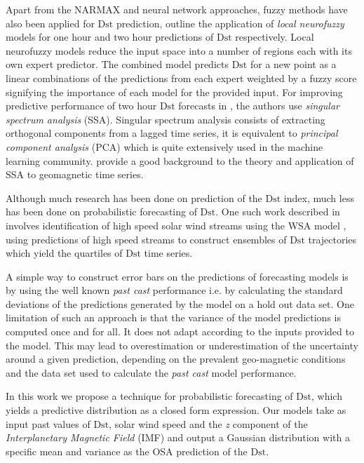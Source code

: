 Apart from the NARMAX and neural network approaches, fuzzy methods have also been applied for 
$\mathrm{Dst}$ prediction, \citet{SWE:SWE146,Sharifi2006} outline the application of 
\emph{local neurofuzzy} models for one hour and two hour predictions of $\mathrm{Dst}$ 
respectively. Local neurofuzzy models reduce the input space into a number of regions each with its 
own expert predictor. The combined model predicts $\mathrm{Dst}$ for a new point as a linear 
combinations of the predictions from each expert weighted by a fuzzy score signifying the 
importance of each model for the provided input. For improving predictive performance of two hour 
$\mathrm{Dst}$ forecasts in \citet{Sharifi2006}, the authors use \emph{singular spectrum analysis} 
(SSA). Singular spectrum analysis consists of extracting orthogonal components from a lagged time 
series, it is equivalent to \emph{principal component analysis} (PCA) which is quite extensively 
used in the machine learning community. \citet{loskutov2001testing,loskutov2001study} provide a 
good background to the theory and application of SSA to geomagnetic time series.

Although much research has been done on prediction of the $\mathrm{Dst}$ index, much less has been 
done on probabilistic forecasting of $\mathrm{Dst}$. One such work described in 
\citet{McPherron:2013} involves identification of high speed solar wind streams using the WSA model 
\citep{WSAModel}, using predictions of high speed streams to construct ensembles of $\mathrm{Dst}$ 
trajectories which yield the quartiles of $\mathrm{Dst}$ time series. 

A simple way to construct error bars on the predictions of forecasting models is by using the well 
known \textit{past cast} performance i.e. by calculating the standard deviations of the predictions 
generated by the model on a hold out data set. One limitation of such an approach is that the 
variance of the model predictions is computed once and for all. It does not adapt according to the 
inputs provided to the model. This may lead to overestimation or underestimation of the uncertainty 
around a given prediction, depending on the prevalent geo-magnetic conditions and the data set used 
to calculate the \textit{past cast} model performance.

In this work we propose a technique for probabilistic forecasting of $\mathrm{Dst}$, which yields a 
predictive distribution as a closed form expression. Our models take as input past values of 
$\mathrm{Dst}$, solar wind speed and the \textit{z} component of the 
\emph{Interplanetary Magnetic Field} (IMF) and output a Gaussian distribution with a specific mean 
and variance as the OSA prediction of the $\mathrm{Dst}$. 

